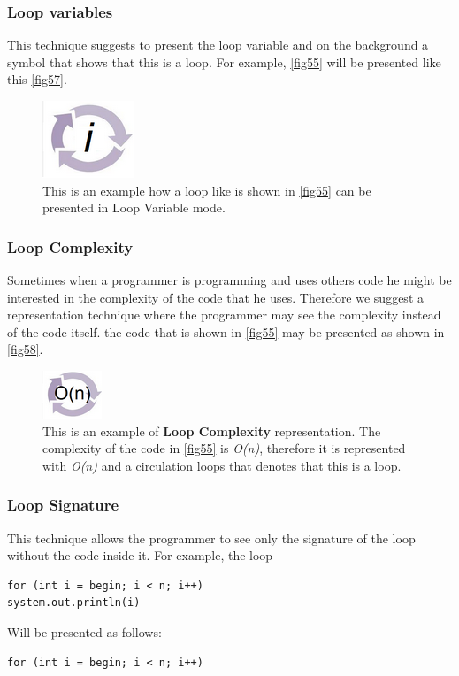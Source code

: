 \subsubsection{Loop variables}
This technique suggests to present the loop variable and on the background a symbol that shows that this is a loop. For example, \autoref{fig55} will be presented like this \autoref{fig57}.
\begin{figure}[H]
	\includegraphics{"./fig/Loop Variable"}
	\caption{This is an example how a loop like is shown in \autoref{fig55} can be presented in Loop Variable mode.}
	\label{fig57}
\end{figure}
\subsubsection{Loop Complexity}
Sometimes when a programmer is programming and uses others code he might be interested in the complexity of the code that he uses. Therefore we suggest a representation technique where the programmer may see the complexity instead of the code itself. the code that is shown in \autoref{fig55} may be presented as shown in \autoref{fig58}.
\begin{figure}[H]
	\includegraphics{"./fig/Code Complexity Representation"}
	\caption{This is an example of \textbf{Loop Complexity} representation. The complexity of the code in \autoref{fig55} is \textit{O(n)}, therefore it is represented with \textit{O(n)} and a circulation loops that denotes that this is a loop.}
	\label{fig58}
\end{figure}
\subsubsection{Loop Signature}
This technique allows the programmer to see only the signature of the loop without the code inside it. For example, the loop 
\begin{lstlisting}
for (int i = begin; i < n; i++)
system.out.println(i)
\end{lstlisting}
Will be presented as follows:
\begin{lstlisting}
for (int i = begin; i < n; i++)
\end{lstlisting}
